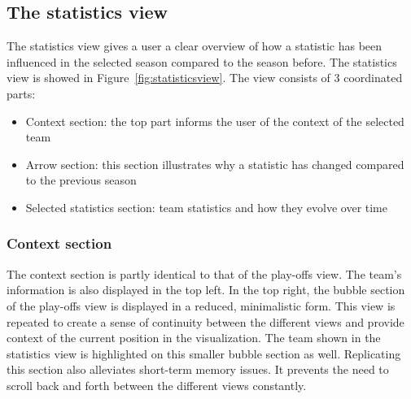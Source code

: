 \documentclass[chi_draft]{sigchi}
\begin{document}
\subsection{The statistics view}
The statistics view gives a user a clear overview of how a statistic has been
influenced in the selected season compared to the season before. The statistics
view is showed in Figure~\ref{fig:statisticsview}. The view consists of 3
coordinated parts:
\begin{itemize}
    \item Context section: the top part informs the user of the context of the
        selected team
    \item Arrow section: this section illustrates why a statistic has changed
        compared to the previous season
    \item Selected statistics section: team statistics and how they evolve over
        time
\end{itemize}

\subsubsection{Context section}
The context section is partly identical to that of the play-offs view. The
team's information is also displayed in the top left. In the top right, the
bubble section of the play-offs view is displayed in a reduced, minimalistic
form. This view is repeated to create a sense of continuity between the
different views and provide context of the current position in the
visualization. The team shown in the statistics view is highlighted on this
smaller bubble section as well. Replicating this section also alleviates
short-term memory issues. It prevents the need to scroll back and forth between
the different views constantly. 
\end{document}
